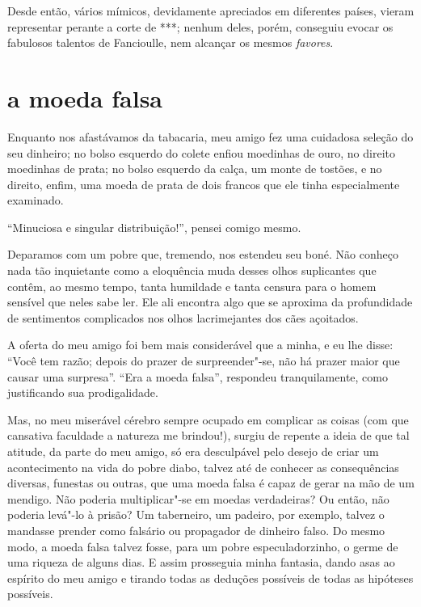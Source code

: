 Desde então, vários mímicos, devidamente apreciados em diferentes
países, vieram representar perante a corte de ***; nenhum deles, porém,
conseguiu evocar os fabulosos talentos de Fancioulle, nem alcançar
os mesmos \textit{favores}. 

\quebra\section[A moeda falsa]{a moeda falsa}

Enquanto nos afastávamos da tabacaria, meu amigo fez uma cuidadosa
seleção do seu dinheiro; no bolso esquerdo do colete enfiou
moedinhas de ouro, no direito moedinhas de prata; no bolso esquerdo da calça, um monte de tostões, e no direito, enfim, uma moeda de prata
de dois francos que ele tinha especialmente examinado.

``Minuciosa e singular distribuição!'', pensei
comigo mesmo.

Deparamos com um pobre que, tremendo, nos estendeu seu boné. Não
conheço nada tão inquietante como a eloquência muda desses olhos
suplicantes que contêm, ao mesmo tempo, tanta humildade e tanta censura para o homem sensível que neles
sabe ler. Ele ali encontra algo que se
aproxima da profundidade de sentimentos complicados nos olhos
lacrimejantes dos cães açoitados.

A oferta do meu amigo foi bem mais considerável que a minha, e eu lhe
disse: ``Você tem razão; depois do prazer de
surpreender"-se, não há prazer maior que causar uma surpresa''. 
``Era a moeda falsa'', respondeu tranquilamente, como justificando sua prodigalidade.

Mas, no meu miserável cérebro sempre ocupado em complicar as coisas (com
que cansativa faculdade a natureza me brindou!),
surgiu de repente a ideia de que tal atitude, da parte do meu amigo, só
era desculpável pelo desejo de criar um acontecimento na vida do
pobre diabo, talvez até de conhecer as consequências diversas, funestas
ou outras, que uma moeda falsa é capaz de gerar na mão de um mendigo. Não
poderia multiplicar"-se em moedas verdadeiras? Ou então, não poderia
levá"-lo à prisão? Um taberneiro, um padeiro, por exemplo, talvez o
mandasse prender como falsário ou propagador de dinheiro falso. Do
mesmo modo, a moeda falsa talvez fosse, para um pobre especuladorzinho,
o germe de uma riqueza de alguns dias. E assim prosseguia minha
fantasia, dando asas ao espírito do meu amigo e tirando todas as
deduções possíveis de todas as hipóteses possíveis.

